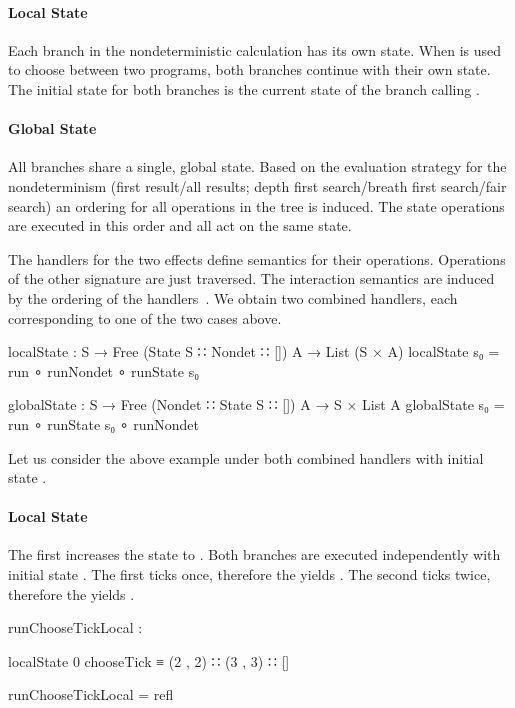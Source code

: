 \paragraph{Local State}
Each branch in the nondeterministic calculation has its own state.
When  is used to choose between two programs, both branches
continue with their own state.
The initial state for both branches is the current state of the branch calling
.
\paragraph{Global State}
All branches share a single, global state.
Based on the evaluation strategy for the nondeterminism (first result/all
results; depth first search/breath first search/fair search) an ordering for all
operations in the tree is induced.
The state operations are executed in this order and all act on the same state.

The handlers for the two effects define semantics for their operations.
Operations of the other signature are just traversed.
The interaction semantics are induced by the ordering of the
handlers~\cite{DBLP:conf/haskell/WuSH14}.
We obtain two combined handlers, each corresponding to one of the two cases
above.

\begin{code}
localState : S → Free (State S ∷ Nondet ∷ []) A → List (S × A)
localState s₀ = run ∘ runNondet ∘ runState s₀

globalState : S → Free (Nondet ∷ State S ∷ []) A → S × List A
globalState s₀ = run ∘ runState s₀ ∘ runNondet
\end{code}
Let us consider the above example under both combined handlers with initial
state .

\paragraph{Local State}
The first  increases the state to .
Both branches are executed independently with initial state .
The first ticks once, therefore the  yields .
The second ticks twice, therefore the  yields .

\begin{center}
\begin{code}
runChooseTickLocal :
\end{code}
\begin{code}[inline]
 localState 0 chooseTick ≡ (2 , 2) ∷ (3 , 3) ∷ []
\end{code}
\begin{code}
runChooseTickLocal = refl
\end{code}
\end{center}


